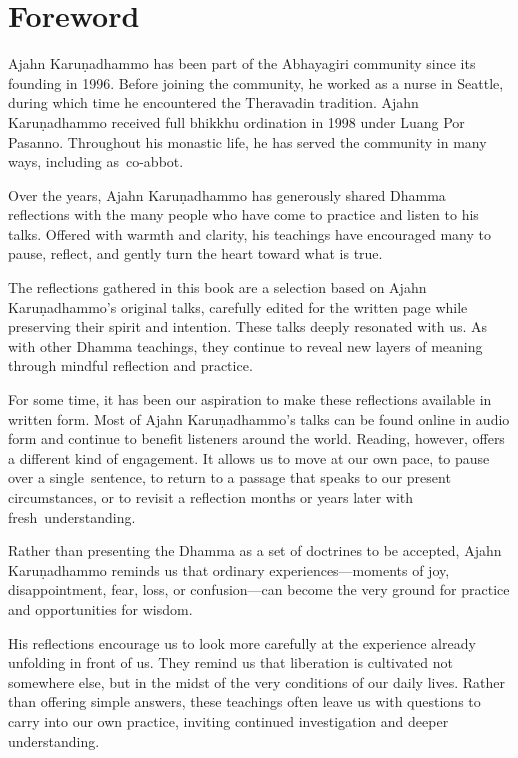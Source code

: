 \chapter{Foreword}

Ajahn Karuṇadhammo has been part of the Abhayagiri \linebreak community since its founding in 1996. Before joining \linebreak the community, he worked as a nurse in Seattle, during which time he encountered the Theravadin tradition. Ajahn Karuṇadhammo received full bhikkhu ordination in 1998 under Luang Por Pasanno. Throughout his monastic life, he has served the community in many ways, including \mbox{as co-abbot.}

Over the years, Ajahn Karuṇadhammo has generously shared Dhamma reflections with the many people who have come to practice and listen to his talks. Offered with warmth and clarity, his teachings have encouraged many to pause, reflect, and gently turn the heart toward what is true.

The reflections gathered in this book are a selection based on Ajahn Karuṇadhammo's original talks, carefully edited for the written page while preserving their spirit and intention. These talks deeply resonated with us. As with other Dhamma teachings, they continue to reveal new layers of meaning through mindful reflection and practice.

For some time, it has been our aspiration to make these reflections available in written form. Most of Ajahn Karuṇadhammo's talks can be found online in audio form and continue to benefit listeners around the world. Reading, \linebreak however, offers a different kind of engagement. It allows us to move at our own pace, to pause over a \mbox{single sentence,} \linebreak to return to a passage that speaks to our present circumstances, or to revisit a reflection months or years later with \mbox{fresh understanding.}

Rather than presenting the Dhamma as a set of doctrines to be accepted, Ajahn Karuṇadhammo reminds us that ordinary experiences---moments of joy, disappointment, fear, loss, or confusion---can become the very ground for practice and opportunities for wisdom.

His reflections encourage us to look more carefully at the experience already unfolding in front of us. They remind us that liberation is cultivated not somewhere else, but in the midst of the very conditions of our daily lives. Rather than offering simple answers, these teachings often leave us with questions to carry into our own practice, inviting continued investigation and deeper understanding.

